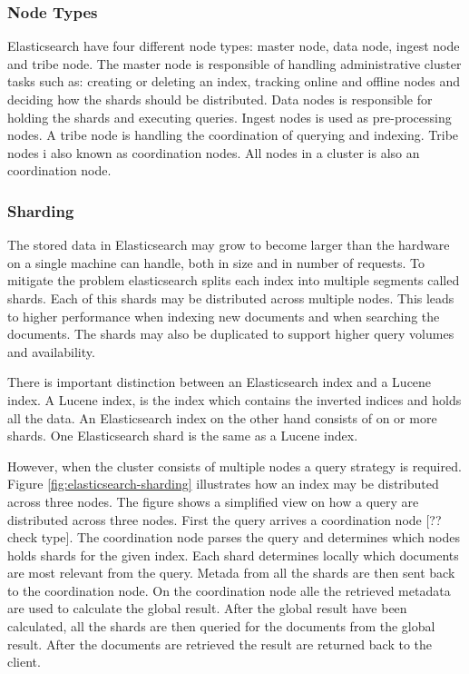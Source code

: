 \subsubsection{Node Types}
Elasticsearch have four different node types: master node, data node, ingest node and tribe node.
The master node is responsible of handling administrative cluster tasks such as:
creating or deleting an index, tracking online and offline nodes and deciding how the shards should be distributed.
Data nodes is responsible for holding the shards and executing queries.
Ingest nodes is used as pre-processing nodes.
A tribe node is handling the coordination of querying and indexing.
Tribe nodes i also known as coordination nodes.
All nodes in a cluster is also an coordination node.


\subsubsection{Sharding}
The stored data in Elasticsearch may grow to become larger than the hardware on a single machine can handle,
both in size and in number of requests.
To mitigate the problem elasticsearch splits each index into multiple segments called shards.
Each of this shards may be distributed across multiple nodes.
This leads to higher performance when indexing new documents and when searching the documents.
The shards may also be duplicated to support higher query volumes and availability.

There is important distinction between an Elasticsearch index and a Lucene index.
A Lucene index, is the index which contains the inverted indices and holds all the data.
An Elasticsearch index on the other hand consists of on or more shards.
One Elasticsearch shard is the same as a Lucene index.

However, when the cluster consists of multiple nodes a query strategy is required.
Figure \ref{fig:elasticsearch-sharding} illustrates how an index may be distributed across three nodes.
The figure shows a simplified view on how a query are distributed across three nodes.
First the query arrives a coordination node [??check type].
The coordination node parses the query and determines which nodes holds shards for the given index.
Each shard determines locally which documents are most relevant from the query.
Metada from all the shards are then sent back to the coordination node.
On the coordination node alle the retrieved metadata are used to calculate the global result.
After the global result have been calculated,
all the shards are then queried for the documents from the global result.
After the documents are retrieved the result are returned back to the client.


